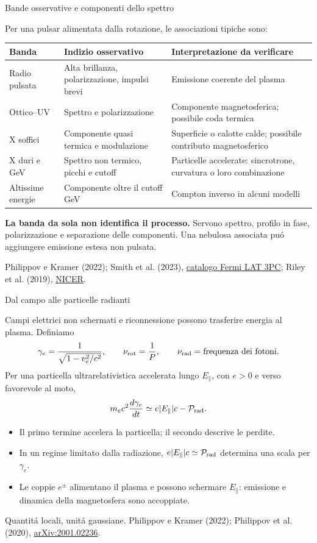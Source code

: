\begin{frame}[t]{Bande osservative e componenti dello spettro}
\small\raggedright
Per una pulsar alimentata dalla rotazione, le associazioni tipiche sono:
\medskip
\begingroup\footnotesize\setlength{\tabcolsep}{3pt}\renewcommand{\arraystretch}{1.22}
\begin{tabular}{@{}p{}p{}p{}@{}}
\textbf{Banda} & \textbf{Indizio osservativo} & \textbf{Interpretazione da verificare} \\
\hline
Radio pulsata & Alta brillanza, polarizzazione, impulsi brevi & Emissione coerente del plasma \\
Ottico--UV & Spettro e polarizzazione & Componente magnetosferica; possibile coda termica \\
X soffici & Componente quasi termica e modulazione & Superficie o calotte calde; possibile contributo magnetosferico \\
X duri e GeV & Spettro non termico, picchi e cutoff & Particelle accelerate: sincrotrone, curvatura o loro combinazione \\
Altissime energie & Componente oltre il cutoff GeV & Compton inverso in alcuni modelli \\
\end{tabular}
\endgroup
\medskip
\textbf{La banda da sola non identifica il processo.}
Servono spettro, profilo in fase, polarizzazione e separazione delle componenti.
Una nebulosa associata pu\'o aggiungere emissione estesa non pulsata.
\par\smallskip
\footnotesize Philippov e Kramer (2022); Smith et al. (2023),
\href{https://arxiv.org/abs/2307.11132}{catalogo Fermi LAT 3PC};
Riley et al. (2019), \href{https://arxiv.org/abs/1912.05702}{NICER}.
\end{frame}

\begin{frame}[t]{Dal campo alle particelle radianti}
\small\raggedright
Campi elettrici non schermati e riconnessione possono trasferire
energia al plasma. Definiamo
\[
\gamma_e=\frac1{\sqrt{1-v_e^2/c^2}},\qquad
\nu_{\rm rot}=\frac1P,\qquad \nu_{\rm rad}=\text{frequenza dei fotoni}.
\]
Per una particella ultrarelativistica accelerata lungo $E_\parallel$,
con $e>0$ e verso favorevole al moto,
\[
m_ec^2\frac{d\gamma_e}{dt}
\simeq e|E_\parallel|c-\mathcal P_{\rm rad}.
\]
\begin{itemize}
\item Il primo termine accelera la particella; il secondo descrive le perdite.
\item In un regime limitato dalla radiazione,
$e|E_\parallel|c\simeq\mathcal P_{\rm rad}$ determina una scala per $\gamma_e$.
\item Le coppie $e^\pm$ alimentano il plasma e possono schermare $E_\parallel$:
emissione e dinamica della magnetosfera sono accoppiate.
\end{itemize}
\par\smallskip
\footnotesize Quantit\'a locali, unit\'a gaussiane.
Philippov e Kramer (2022); Philippov et al. (2020),
\href{https://arxiv.org/abs/2001.02236}{arXiv:2001.02236}.
\end{frame}

